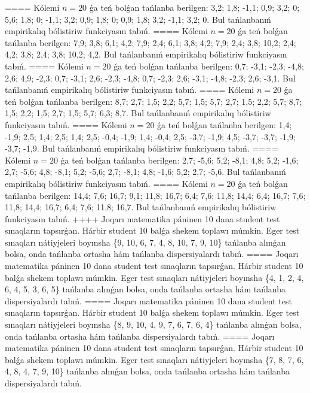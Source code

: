 ====
Kólemi \(n = 20\) ǵa teń bolǵan tańlanba berilgen: 3,2; 1,8; -1,1; 0,9; 3,2; 0; 5,6; 1,8; 0; -1,1; 3,2; 0,9; 1,8; 0; 0,9; 1,8; 3,2; -1,1; 3,2; 0. Bul tańlanbanıń empirikalıq bólistiriw funkciyasın tabıń.
====
Kólemi \(n = 20\) ǵa teń bolǵan tańlanba berilgen: 7,9; 3,8; 6,1; 4,2; 7,9; 2,4; 6,1; 3,8; 4,2; 7,9; 2,4; 3,8; 10,2; 2,4; 4,2; 3,8; 2,4; 3,8; 10,2; 4,2. Bul tańlanbanıń empirikalıq bólistiriw funkciyasın tabıń.
====
Kólemi \(n = 20\) ǵa teń bolǵan tańlanba berilgen: 0,7; -3,1; -2,3; -4,8; 2,6; 4,9; -2,3; 0,7; -3,1; 2,6; -2,3; -4,8; 0,7; -2,3; 2,6; -3,1; -4,8; -2,3; 2,6; -3,1. Bul tańlanbanıń empirikalıq bólistiriw funkciyasın tabıń.
====
Kólemi \(n = 20\) ǵa teń bolǵan tańlanba berilgen: 8,7; 2,7; 1,5; 2,2; 5,7; 1,5; 5,7; 2,7; 1,5; 2,2; 5,7; 8,7; 1,5; 2,2; 1,5; 2,7; 1,5; 5,7; 6,3; 8,7. Bul tańlanbanıń empirikalıq bólistiriw funkciyasın tabıń.
====
Kólemi \(n = 20\) ǵa teń bolǵan tańlanba berilgen: 1,4; -1,9; 2,5; 1,4; 2,5; 1,4; 2,5; -0,4; -1,9; 1,4; -0,4; 2,5; -3,7; -1,9; 4,5; -3,7; -3,7; -1,9; -3,7; -1,9. Bul tańlanbanıń empirikalıq bólistiriw funkciyasın tabıń.
====
Kólemi \(n = 20\) ǵa teń bolǵan tańlanba berilgen: 2,7; -5,6; 5,2; -8,1; 4,8; 5,2; -1,6; 2,7; -5,6; 4,8; -8,1; 5,2; -5,6; 2,7; -8,1; 4,8; -1,6; 5,2; 2,7; -5,6. Bul tańlanbanıń empirikalıq bólistiriw funkciyasın tabıń.
====
Kólemi \(n = 20\) ǵa teń bolǵan tańlanba berilgen: 14,4; 7,6; 16,7; 9,1; 11,8; 16,7; 6,4; 7,6; 11,8; 14,4; 6,4; 16,7; 7,6; 11,8; 14,4; 16,7; 6,4; 7,6; 11,8; 16,7. Bul tańlanbanıń empirikalıq bólistiriw funkciyasın tabıń.
++++
Joqarı matematika páninen 10 dana student test sınaqların tapsırǵan. Hárbir student 10 balǵa shekem toplawı múmkin. Eger test sınaqları nátiyjeleri boyınsha \{9, 10, 6, 7, 4, 8, 10, 7, 9, 10\} tańlanba alınǵan bolsa, onda tańlanba ortasha hám tańlanba dispersiyalardı tabıń.
====
Joqarı matematika páninen 10 dana student test sınaqların tapsırǵan. Hárbir student 10 balǵa shekem toplawı múmkin. Eger test sınaqları nátiyjeleri boyınsha \{4, 1, 2, 4, 6, 4, 5, 3, 6, 5\} tańlanba alınǵan bolsa, onda tańlanba ortasha hám tańlanba dispersiyalardı tabıń.
====
Joqarı matematika páninen 10 dana student test sınaqların tapsırǵan. Hárbir student 10 balǵa shekem toplawı múmkin. Eger test sınaqları nátiyjeleri boyınsha \{8, 9, 10, 4, 9, 7, 6, 7, 6, 4\} tańlanba alınǵan bolsa, onda tańlanba ortasha hám tańlanba dispersiyalardı tabıń.
====
Joqarı matematika páninen 10 dana student test sınaqların tapsırǵan. Hárbir student 10 balǵa shekem toplawı múmkin. Eger test sınaqları nátiyjeleri boyınsha \{7, 8, 7, 6, 4, 8, 4, 7, 9, 10\} tańlanba alınǵan bolsa, onda tańlanba ortasha hám tańlanba dispersiyalardı tabıń.
